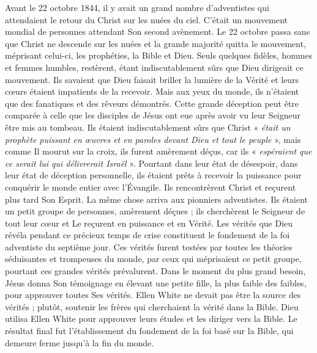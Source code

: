 Avant le 22 octobre 1844, il y avait un grand nombre d'adventistes qui attendaient le retour du Christ sur les nuées du ciel. C'était un mouvement mondial de personnes attendant Son second avènement. Le 22 octobre passa sans que Christ ne descende sur les nuées et la grande majorité quitta le mouvement, méprisant celui-ci, les prophéties, la Bible et Dieu. Seuls quelques fidèles, hommes et femmes humbles, restèrent, étant indiscutablement sûrs que Dieu dirigeait ce mouvement. Ils savaient que Dieu faisait briller la lumière de la Vérité et leurs cœurs étaient impatients de la recevoir. Mais aux yeux du monde, ils n'étaient que des fanatiques et des rêveurs démontrés. Cette grande déception peut être comparée à celle que les disciples de Jésus ont eue après avoir vu leur Seigneur être mis au tombeau. Ils étaient indiscutablement sûrs que Christ « \textit{était un prophète puissant en œuvres et en paroles devant Dieu et tout le peuple} », mais comme Il mourut sur la croix, ils furent amèrement déçus, car ils « \textit{espéraient que ce serait lui qui délivrerait Israël} ». Pourtant dans leur état de désespoir, dans leur état de déception personnelle, ils étaient prêts à recevoir la puissance pour conquérir le monde entier avec l'Évangile. Ils rencontrèrent Christ et reçurent plus tard Son Esprit. La même chose arriva aux pionniers adventistes. Ils étaient un petit groupe de personnes, amèrement déçues ; ils cherchèrent le Seigneur de tout leur cœur et Le reçurent en puissance et en Vérité. Les vérités que Dieu révéla pendant ce précieux temps de crise constituent le fondement de la foi adventiste du septième jour. Ces vérités furent testées par toutes les théories séduisantes et trompeuses du monde, par ceux qui méprisaient ce petit groupe, pourtant ces grandes vérités prévalurent. Dans le moment du plus grand besoin, Jésus donna Son témoignage en élevant une petite fille, la plus faible des faibles, pour approuver toutes Ses vérités. Ellen White ne devait pas être la source des vérités ; plutôt, soutenir les frères qui cherchaient la vérité dans la Bible. Dieu utilisa Ellen White pour approuver leurs études et les diriger vers la Bible. Le résultat final fut l'établissement du fondement de la foi basé sur la Bible, qui demeure ferme jusqu'à la fin du monde.


